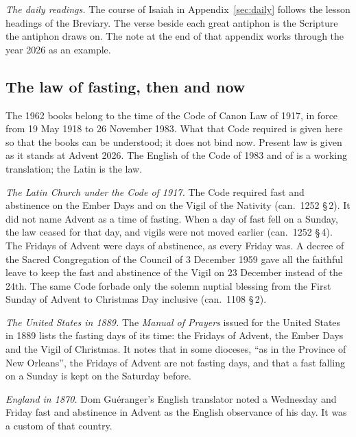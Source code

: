 \textit{The daily readings.} The course of Isaiah in Appendix~\ref{sec:daily}
follows the lesson headings of the Breviary. The verse beside each great
antiphon is the Scripture the antiphon draws on. The note at the end of that
appendix works through the year 2026 as an example.

\subsection{The law of fasting, then and now}

The 1962 books belong to the time of the Code of Canon Law of 1917, in force
from 19 May 1918 to 26 November 1983. What that Code required is given here so
that the books can be understood; it does not bind now. Present law is given as
it stands at Advent 2026. The English of the Code of 1983 and of
 is a working translation; the Latin is the law.

\textit{The Latin Church under the Code of 1917.} The Code required fast and
abstinence on the Ember Days and on the Vigil of the Nativity (can.~1252
\S\,2). It did not name Advent as a time of fasting. When a day of fast fell on
a Sunday, the law ceased for that day, and vigils were not moved earlier
(can.~1252 \S\,4). The Fridays of Advent were days of abstinence, as every
Friday was. A decree of the Sacred Congregation of the Council of 3
December 1959 gave all the faithful leave to keep the fast and abstinence of
the Vigil on 23 December instead of the 24th. The same Code forbade only the
solemn nuptial blessing from the First Sunday of Advent to Christmas Day
inclusive (can.~1108 \S\,2).

\textit{The United States in 1889.} The \textit{Manual of Prayers} issued for
the United States in 1889 lists the fasting days of its time: the Fridays of
Advent, the Ember Days and the Vigil of Christmas. It notes that in some
dioceses, ``as in the Province of New Orleans'', the Fridays of Advent are not
fasting days, and that a fast falling on a Sunday is kept on the Saturday
before.

\textit{England in 1870.} Dom Guéranger's English translator noted a Wednesday
and Friday fast and abstinence in Advent as the English observance of his day.
It was a custom of that country.

